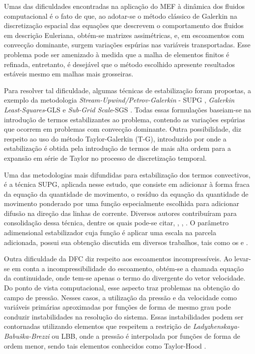 \documentclass[tese_patricia.tex]{subfiles}
\begin{document}
Umas das dificuldades encontradas na aplicação do MEF à dinâmica dos fluidos computacional é o fato de que, ao adotar-se o método clássico de Galerkin na discretização espacial das equações que descrevem o comportamento dos fluidos em descrição Euleriana, obtém-se matrizes assimétricas, e, em escoamentos com convecção dominante, surgem variações espúrias nas variáveis transportadas. Esse problema pode ser amenizado à medida que a malha de elementos finitos é refinada, entretanto, é desejável que o método escolhido apresente resultados estáveis mesmo em malhas mais grosseiras.

Para resolver tal dificuldade, algumas técnicas de estabilização foram propostas, a exemplo da metodologia \textit{Stream-Upwind/Petrov-Galerkin} - SUPG \cite{BrooksH:1982}, \textit{Galerkin Least-Squares}-GLS \cite{HughesFH:1989}  e \textit{Sub-Grid Scale}-SGS \cite{Hughes:1995}. Todas essas formulações baseiam-se na introdução de termos estabilizantes ao problema, contendo as variações espúrias que ocorrem em problemas com convecção dominante. Outra possibilidade, diz respeito ao uso do método Taylor-Galerkin (T-G), introduzido por  onde a estabilização é obtida pela introdução de termos de mais alta ordem para a expansão em série de Taylor no processo de discretização temporal.

Uma das metodologias mais difundidas para estabilização dos termos convectivos, é a técnica SUPG, aplicada nesse estudo, que consiste em adicionar à forma fraca da equação da quantidade de movimento, o resíduo da equação da quantidade de movimento ponderado por uma função especialmente escolhida para adicionar difusão na direção das linhas de corrente. Diversos autores contribuíram para consolidação dessa técnica, dentre os quais pode-se citar, , , . O parâmetro adimensional estabilizador cuja função é aplicar uma escala na parcela adicionada, possui sua obtenção discutida em diversos trabalhos, tais como os  e .

Outra dificuldade da DFC diz respeito aos escoamentos incompressíveis. Ao levar-se em conta a incompressibilidade do escoamento, obtém-se a chamada equação da continuidade, onde tem-se apenas o termo do divergente do vetor velocidade. Do ponto de vista computacional, esse aspecto traz problemas na obtenção do campo de pressão. Nesses casos, a utilização da pressão e da velocidade como variáveis primárias aproximadas por funções de forma de mesmo grau pode conduzir instabilidades na resolução do sistema. Essas instabilidades podem ser contornadas utilizando elementos que respeitem a restrição de \textit{Ladyzhenskaya-Babuška-Brezzi} ou LBB, onde a pressão é interpolada por funções de forma de ordem menor, sendo tais elementos conhecidos como Taylor-Hood \cite{BrezziF:1991,ZienkiewiczTN:2005,StrangF:2008}.
\end{document}
